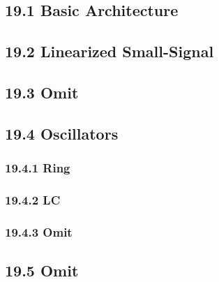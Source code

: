 \subsection{19.1 Basic Architecture}
\subsection{19.2 Linearized Small-Signal}
\subsection{19.3 Omit}
\subsection{19.4 Oscillators}
  \subsubsection{19.4.1 Ring}
  \subsubsection{19.4.2 LC}
  \subsubsection{19.4.3 Omit}
\subsection{19.5 Omit}

